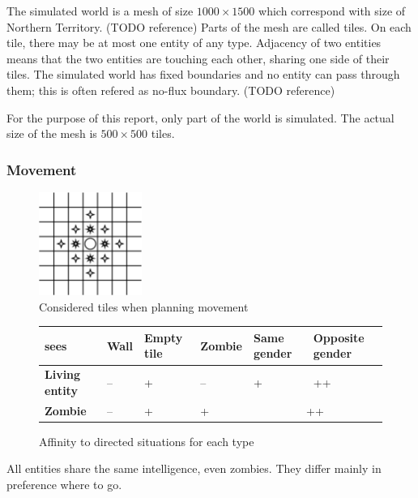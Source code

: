 \documentclass[a4paper]{article}
\begin{document}
The simulated world is a mesh of size $1000 \times 1500$ which correspond with size of Northern Territory. (TODO reference)
Parts of the mesh are called tiles.
On each tile, there may be at most one entity of any type.
Adjacency of two entities means that the two entities are touching each other, sharing one side of their tiles.
The simulated world has fixed boundaries and no entity can pass through them; this is often refered as no-flux boundary. (TODO reference)

For the purpose of this report, only part of the world is simulated.
The actual size of the mesh is $500 \times 500$ tiles.

\subsubsection{Movement}

\begin{figure}[ht]
    \centering
    \includegraphics[width=0.3\textwidth]{movement}
    \caption{Considered tiles when planning movement}
\end{figure}

\begin{figure}[ht]
    \centering
    \begin{tabu} {| X[1.8,c,p] || X[1,c,p] | X[1,c,p] | X[1,c,p] | X[1,c,p] | X[1.2,c,p] |}
        \rowfont{\bfseries}
        \hline
        sees &
        Wall &
        Empty tile&
        Zombie &
        Same gender &
        Opposite gender \\
        \hline
        \hline
        \textbf{Living entity} & -- & + & -- & + & ++ \\
        \hline
        \textbf{Zombie} & -- & + & + &  \\
        \hline
    \end{tabu}
    \caption{Affinity to directed situations for each type}
\end{figure}


All entities share the same intelligence, even zombies.
They differ mainly in preference where to go.
\end{document}
